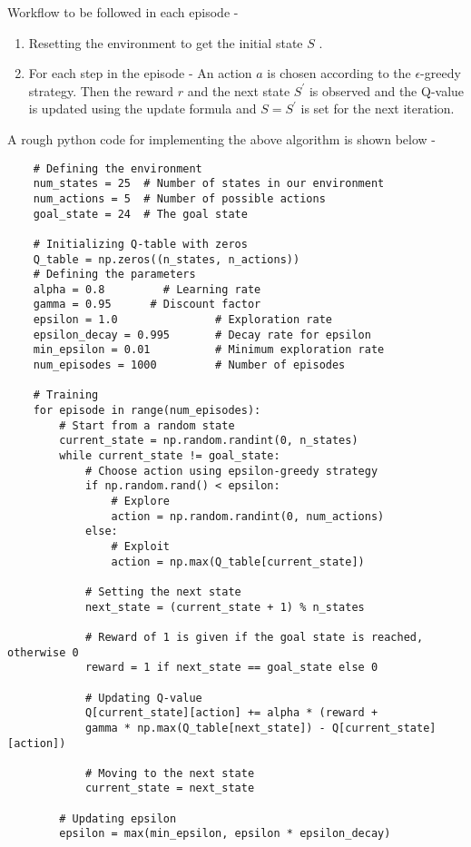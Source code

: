 \documentclass{report}
\begin{document}
Workflow to be followed in each episode -
\begin{enumerate}
    \item Resetting the environment to get the initial state $S$ .
    \item For each step in the episode -
        An action $a$ is chosen according to the $\epsilon$-greedy strategy.
        Then the reward $r$ and the next state $S^\prime$ is observed and the Q-value is updated using the update formula and $S=S^\prime$ is set for the next iteration.
\end{enumerate}
\newpage
A rough python code for implementing the above algorithm is shown below - 
\begin{lstlisting}
    # Defining the environment
    num_states = 25  # Number of states in our environment
    num_actions = 5  # Number of possible actions 
    goal_state = 24  # The goal state
    
    # Initializing Q-table with zeros
    Q_table = np.zeros((n_states, n_actions))
    # Defining the parameters
    alpha = 0.8         # Learning rate
    gamma = 0.95      # Discount factor
    epsilon = 1.0               # Exploration rate
    epsilon_decay = 0.995       # Decay rate for epsilon
    min_epsilon = 0.01          # Minimum exploration rate
    num_episodes = 1000         # Number of episodes
    
    # Training
    for episode in range(num_episodes):
        # Start from a random state
        current_state = np.random.randint(0, n_states)  
        while current_state != goal_state:
            # Choose action using epsilon-greedy strategy
            if np.random.rand() < epsilon:
                # Explore
                action = np.random.randint(0, num_actions)  
            else:
                # Exploit
                action = np.max(Q_table[current_state])  

            # Setting the next state
            next_state = (current_state + 1) % n_states

            # Reward of 1 is given if the goal state is reached, otherwise 0
            reward = 1 if next_state == goal_state else 0

            # Updating Q-value
            Q[current_state][action] += alpha * (reward +
            gamma * np.max(Q_table[next_state]) - Q[current_state][action])

            # Moving to the next state
            current_state = next_state

        # Updating epsilon
        epsilon = max(min_epsilon, epsilon * epsilon_decay)

\end{lstlisting}
\end{document}

